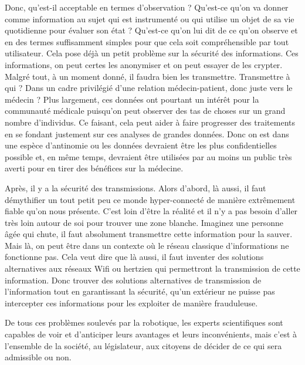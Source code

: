 Donc, qu'est-il acceptable en termes d'observation ? Qu'est-ce qu'on va donner comme information au sujet qui est instrumenté ou qui utilise un objet de sa vie quotidienne pour évaluer son état ? Qu'est-ce qu'on lui dit de ce qu'on observe et en des termes suffisamment simples pour que cela soit compréhensible par tout utilisateur. Cela pose déjà un petit problème sur la sécurité des informations. Ces informations, on peut certes les anonymiser et on peut essayer de les crypter. Malgré tout, à un moment donné, il faudra bien les transmettre. Transmettre à qui ? Dans un cadre privilégié d'une relation médecin-patient, donc juste vers le médecin ? Plus largement, ces données ont pourtant un intérêt pour la communauté médicale puisqu'on peut observer des tas de choses sur un grand nombre d'individus. Ce faisant, cela peut aider à faire progresser des traitements en se fondant justement sur ces analyses de grandes données. Donc on est dans une espèce d’antinomie ou les données devraient être les plus confidentielles possible et, en même temps, devraient être utilisées par au moins un public très averti pour en tirer des bénéfices sur la médecine. 

Après, il y a la sécurité des transmissions. Alors d'abord, là aussi, il faut démythifier un tout petit peu ce monde hyper-connecté de manière extrêmement fiable qu'on nous présente. C'est loin d'être la réalité et il n'y a pas besoin d'aller très loin autour de soi pour trouver une zone blanche. Imaginez une personne âgée qui chute, il faut absolument transmettre cette information pour la sauver. Mais là, on peut être dans un contexte où le réseau classique d'informations ne fonctionne pas. Cela veut dire que là aussi, il faut inventer des solutions alternatives aux réseaux Wifi ou hertzien qui permettront la transmission de cette information. Donc trouver des solutions alternatives de transmission de l'information tout en garantissant la sécurité, qu'un extérieur ne puisse pas intercepter ces informations pour les exploiter de manière frauduleuse. 

De tous ces problèmes soulevés par la robotique, les experts scientifiques sont capables de voir et d'anticiper leurs avantages et leurs inconvénients, mais c'est à l'ensemble de la société, au législateur, aux citoyens de décider de ce qui sera admissible ou non. 



